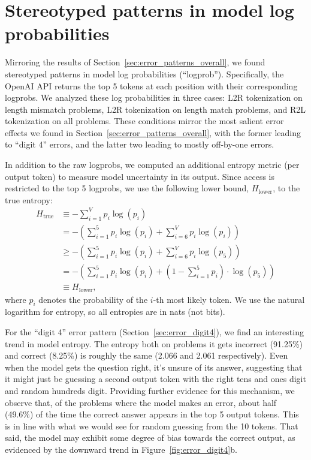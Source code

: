 \documentclass{article}
\theoremstyle{plain}
\theoremstyle{definition}
\theoremstyle{remark}
\begin{document}
\section{Stereotyped patterns in model log probabilities}
\label{appx:logprobs}

Mirroring the results of Section~\ref{sec:error_patterns_overall}, we found stereotyped patterns in model log probabilities (``logprob''). Specifically, the OpenAI API returns the top 5 tokens at each position with their corresponding logprobs. We analyzed these log probabilities in three cases: L2R tokenization on length mismatch problems, L2R tokenization on length match problems, and R2L tokenization on all problems. These conditions mirror the most salient error effects we found in Section~\ref{sec:error_patterns_overall}, with the former leading to ``digit 4'' errors, and the latter two leading to mostly off-by-one errors.

In addition to the raw logprobs, we computed an additional entropy metric (per output token) to measure model uncertainty in its output. Since access is restricted to the top 5 logprobs, we use the following lower bound, $H_{\text{lower}}$, to the true entropy:
\begin{align*}
H_{\text{true}} &\equiv - \sum_{i=1}^V p_i \log\left(p_i\right) \\
&= - \left(\sum_{i=1}^5 p_i \log\left(p_i\right) + \sum_{i=6}^V p_i \log\left(p_i\right) \right) \\
&\geq - \left(\sum_{i=1}^5 p_i \log\left(p_i\right) + \sum_{i=6}^V p_i \log\left(p_5\right) \right) \\
&= - \left(\sum_{i=1}^5 p_i \log\left(p_i\right) + \left(1-\sum_{i=1}^5 p_i\right) \cdot \log\left(p_5\right)\right) \\
&\equiv H_{\text{lower}},
\end{align*}
where $p_i$ denotes the probability of the $i$-th most likely token. We use the natural logarithm for entropy, so all entropies are in nats (not bits).

For the ``digit 4'' error pattern (Section~\ref{sec:error_digit4}), we find an interesting trend in model entropy. The entropy both on problems it gets incorrect (91.25\%) and correct (8.25\%) is roughly the same (2.066 and 2.061 respectively). Even when the model gets the question right, it's unsure of its answer, suggesting that it might just be guessing a second output token with the right tens and ones digit and random hundreds digit. Providing further evidence for this mechanism, we observe that, of the problems where the model makes an error, about half (49.6\%) of the time the correct answer appears in the top 5 output tokens. This is in line with what we would see for random guessing from the 10 tokens. That said, the model may exhibit some degree of bias towards the correct output, as evidenced by the downward trend in Figure~\ref{fig:error_digit4}b.
\end{document}
